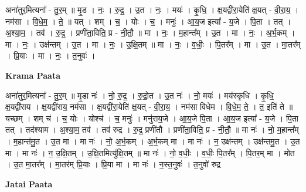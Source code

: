 \documentclass[17pt]{extarticle}
\begin{document}
अना॑तुर॒मित्यना᳚ - तु॒र॒म् ॥ मृ॒ड । नः॒ । रु॒द्र॒ । उ॒त । नः॒ । मयः॑ । कृ॒धि॒ । क्ष॒यद्वी॑रा॒येति॑ क्ष॒यत् - वी॒रा॒य॒ । नम॑सा । वि॒धे॒म॒ । ते॒ ॥ यत् । शम् । च॒ । योः । च॒ । मनुः॑ । आ॒य॒ज इत्या᳚ - य॒जे । पि॒ता । तत् । अ॒श्या॒म॒ । तव॑ । रु॒द्र॒ । प्रणी॑ता॒विति॒ प्र - नी॒तौ॒ ॥ मा । नः॒ । म॒हान्त᳚म् । उ॒त । मा । नः॒ । अ॒र्भ॒कम् । मा । नः॒ । उक्ष॑न्तम् । उ॒त । मा । नः॒ । उ॒क्षि॒तम् ॥ मा । नः॒ । व॒धीः॒ । पि॒तर᳚म् । मा । उ॒त । मा॒तर᳚म् । प्रि॒याः । मा । नः॒ । त॒नुवः॑ ।  \newline


\textbf{Krama Paata} \newline

अना॑तुर॒मित्यना᳚ - तु॒र॒म् ॥ मृ॒डा नः॑ । नो॒ रु॒द्र॒ । रु॒द्रो॒त । उ॒त नः॑ । नो॒ मयः॑ । मय॑स्कृधि । कृ॒धि॒ क्ष॒यद्वी॑राय । क्ष॒यद्वी॑राय॒ नम॑सा । क्ष॒यद्वी॑रा॒येति॑ क्ष॒यत् - वी॒रा॒य॒ । नम॑सा विधेम । वि॒धे॒म॒ ते॒ । त॒ इति॑ ते ॥ यच्छम् । शम् च॑ । च॒ योः । योश्च॑ । च॒ मनुः॑ । मनु॑राय॒जे । आ॒य॒जे पि॒ता । आ॒य॒ज इत्या᳚ - य॒जे । पि॒ता तत् । तद॑श्याम । अ॒श्या॒म॒ तव॑ । तव॑ रुद्र । रु॒द्र॒ प्रणी॑तौ । प्रणी॑ता॒विति॒ प्र - नी॒तौ॒ ॥ मा नः॑ । नो॒ म॒हान्त᳚म् । म॒हान्त॑मु॒त । उ॒त मा । मा नः॑ । नो॒ अ॒र्भ॒कम् । अ॒र्भ॒कम् मा । मा नः॑ । न॒ उक्ष॑न्तम् । उक्ष॑न्तमु॒त । उ॒त मा । मा नः॑ । न॒ उ॒क्षि॒तम् । उ॒क्षि॒तमित्यु॑क्षि॒तम् ॥ मा नः॑ । नो॒ व॒धीः॒ । व॒धीः॒ पि॒तर᳚म् । पि॒तर॒म् मा । मोत । उ॒त मा॒तर᳚म् । मा॒तर॑म् प्रि॒याः । प्रि॒या मा । मा नः॑ । न॒स्त॒नुवः॑ । त॒नुवो॑ रुद्र \newline

\textbf{Jatai Paata} \newline
\end{document}
